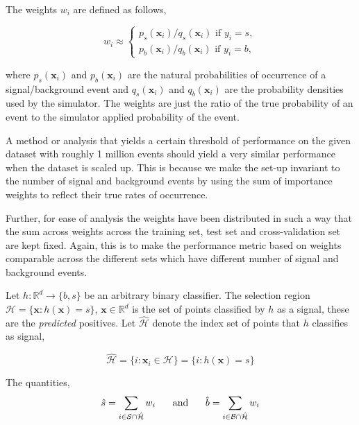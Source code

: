 The weights $w_{i}$ are defined as follows, 

\begin{equation}
w_{i} \approx \begin{cases} p_{s}(\mathbf{x}_{i})/q_{s}(\mathbf{x}_{i}) \textrm{ if } y_{i} = s, \\ p_{b}(\mathbf{x}_{i})/q_{b}(\mathbf{x}_{i}) \textrm{ if } y_{i} = b, 
\end{cases}
\label{wratio}
\end{equation}

where $p_{s}(\mathbf{x}_{i})$ and $p_{b}(\mathbf{x}_{i})$ are the natural probabilities of occurrence of a signal/background event and $q_{s}(\mathbf{x}_{i})$ and $q_{b}(\mathbf{x}_{i})$ are the probability densities used by the simulator. The weights are just the ratio of the true probability of an event to the simulator applied probability of the event. 

A method or analysis that yields a certain threshold of performance on the given dataset with roughly 1 million events should yield a very similar performance when the dataset is scaled up. This is because we make the set-up invariant to the number of signal and background events by using the sum of importance weights to reflect their true rates of occurrence. 

Further, for ease of analysis the weights have been distributed in such a way that the sum across weights across the training set, test set and cross-validation set are kept fixed. 
Again, this is to make the performance metric based on weights comparable across the different sets which have different number of signal and background events.   

Let $h: \mathbb{R}^{d} \rightarrow \{b,s\} $ be an arbitrary binary classifier. The selection region $\mathcal{H} = \{\mathbf{x} : h(\mathbf{x}) = s\}$, $\mathbf{x} \in \mathbb{R}^{d}$ is the set of points classified by $h$ as a signal, these are the \textit{predicted} positives. Let $\hat{\mathcal{H}}$ denote the index set of points that $h$ classifies as signal, 

\begin{equation}
\hat{\mathcal{H}} = \{i : \mathbf{x}_{i} \in \mathcal{H}\} = \{i : h(\mathbf{x}) = s \} 
\label{index_select}
\end{equation}

The quantities, 
\begin{equation} 
\hat{s} = \sum_{i \in \mathcal{S}\cap \hat{\mathcal{H}}} w_{i} \hspace{5mm}
\textrm{    and    } \hspace{5mm}
\hat{b} = \sum_{i \in \mathcal{B}\cap\hat{\mathcal{H}}} w_{i} 
\label{unbiased}
\end{equation} 

